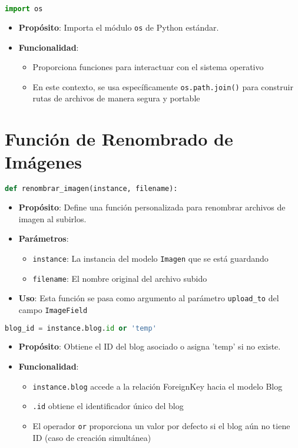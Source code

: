 \documentclass[11pt,a4paper]{report}
\begin{document}
	\begin{lstlisting}[language=Python]
		import os
	\end{lstlisting}
	\begin{itemize}
		\item \textbf{Propósito}: Importa el módulo \texttt{os} de Python estándar.
		\item \textbf{Funcionalidad}: 
		\begin{itemize}
			\item Proporciona funciones para interactuar con el sistema operativo
			\item En este contexto, se usa específicamente \texttt{os.path.join()} para construir rutas de archivos de manera segura y portable
		\end{itemize}
	\end{itemize}
	
	\section{Función de Renombrado de Imágenes}
	
	\begin{lstlisting}[language=Python]
	def renombrar_imagen(instance, filename):
	\end{lstlisting}
	\begin{itemize}
		\item \textbf{Propósito}: Define una función personalizada para renombrar archivos de imagen al subirlos.
		\item \textbf{Parámetros}:
		\begin{itemize}
			\item \texttt{instance}: La instancia del modelo \texttt{Imagen} que se está guardando
			\item \texttt{filename}: El nombre original del archivo subido
		\end{itemize}
		\item \textbf{Uso}: Esta función se pasa como argumento al parámetro \texttt{upload\_to} del campo \texttt{ImageField}
	\end{itemize}
	
	\begin{lstlisting}[language=Python]
		blog_id = instance.blog.id or 'temp'
	\end{lstlisting}
	\begin{itemize}
		\item \textbf{Propósito}: Obtiene el ID del blog asociado o asigna 'temp' si no existe.
		\item \textbf{Funcionalidad}:
		\begin{itemize}
			\item \texttt{instance.blog} accede a la relación ForeignKey hacia el modelo Blog
			\item \texttt{.id} obtiene el identificador único del blog
			\item El operador \texttt{or} proporciona un valor por defecto si el blog aún no tiene ID (caso de creación simultánea)
		\end{itemize}
	\end{itemize}
	
\end{document}
